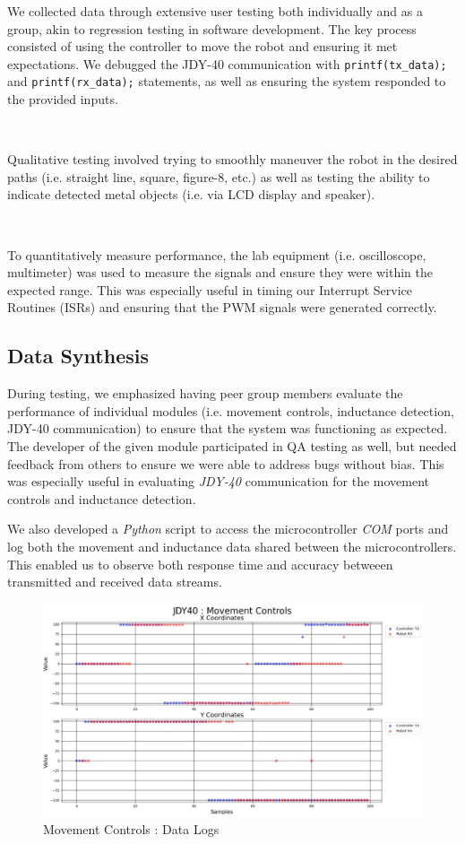 \documentclass{article}
\begin{document}
We collected data through extensive user testing both individually and as a group, akin to regression testing in software development.
The key process consisted of using the controller to move the robot and ensuring it met expectations. We debugged the JDY-40 communication with
\texttt{printf(tx\_data);} and \texttt{printf(rx\_data);} statements, as well as ensuring the system responded to the provided inputs.

\

Qualitative testing involved trying to smoothly maneuver the robot in the desired paths (i.e. straight line, square, figure-8, etc.) as well as testing the ability to
indicate detected metal objects (i.e. via LCD display and speaker).

\

To quantitatively measure performance, the lab equipment (i.e. oscilloscope, multimeter) was used to measure the signals and ensure they were within the expected range. This was especially useful in timing our
Interrupt Service Routines (ISRs) and ensuring that the PWM signals were generated correctly.

\subsection{Data Synthesis}

During testing, we emphasized having peer group members evaluate the performance of individual modules (i.e. movement controls, inductance detection, JDY-40 communication) to
ensure that the system was functioning as expected. The developer of the given module participated in QA testing as well, but needed feedback from others to ensure we were able to address
bugs without bias. This was especially useful in evaluating \textit{JDY-40} communication for the movement controls and inductance detection.

We also developed a \textit{Python} script to access the microcontroller \textit{COM} ports and log both the movement and inductance data shared between the microcontrollers. This enabled
us to observe both response time and accuracy betweeen transmitted and received data streams.

\begin{figure}[htbp]
    \centering
    \includegraphics[width=1\textwidth]{Figures/Movement_Logs.jpg}
    \caption{Movement Controls : Data Logs}
    \label{fig:movement_controls_logs}
\end{figure}
\end{document}
